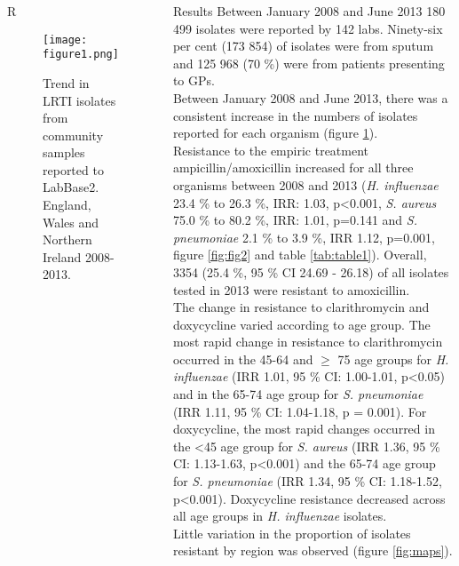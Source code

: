 \documentclass[final, 14pt]{beamer}
\begin{document}
\begin{frame}
\begin{columns}[t]
\begin{minipage}[t]{.95\textwidth}
\begin{block}{\textcolor{comp_blue}{R}}  
    \begin{figure}
   \texttt{[image: figure1.png]}
   \caption{Trend in LRTI isolates from community samples reported to LabBase2. England, Wales and Northern Ireland 2008-2013.}
   \label{fig:fig1}
   \end{figure}

\end{block}  
\end{minipage}
  
 \begin{minipage}[t]{.95\textwidth} %
  \begin{block}{Results}
   Between January 2008 and June 2013 180 499 isolates were reported by 142 labs. 
   Ninety-six per cent (173 854) of isolates were from sputum and 125 968 (70 \%) were from patients presenting to GPs. \\
   Between January 2008 and June 2013, there was a consistent increase in the numbers of isolates reported for each organism (figure \ref{fig:fig1}).\\
Resistance to the empiric treatment ampicillin/amoxicillin increased for all three organisms between 2008 and 2013 (\textit{H. influenzae} 23.4 \% to 26.3 \%, IRR: 1.03, p\textless0.001, \textit{S. aureus} 75.0 \% to 80.2 \%, IRR: 1.01, p=0.141 and \textit{S. pneumoniae} 2.1 \% to 3.9 \%, IRR 1.12, p=0.001, figure \ref{fig:fig2} and table \ref{tab:table1}).
   Overall, 3354 (25.4 \%, 95 \% CI 24.69 - 26.18) of all isolates tested in 2013 were resistant to amoxicillin. \\
   The change in resistance to clarithromycin and doxycycline varied according to age group. 
   The most rapid change in resistance to clarithromycin occurred in the 45-64 and $\ge$ 75 age groups for \textit{H. influenzae} (IRR 1.01, 95 \% CI: 1.00-1.01, p\textless0.05) and in the 65-74 age group for \textit{S. pneumoniae} (IRR 1.11, 95 \% CI: 1.04-1.18, p = 0.001). 
   For doxycycline, the most rapid changes occurred in the \textless 45 age group for \textit{S. aureus} (IRR 1.36, 95 \% CI: 1.13-1.63, p\textless0.001) and the 65-74 age group for \textit{S. pneumoniae} (IRR 1.34, 95 \% CI: 1.18-1.52, p\textless0.001). 
   Doxycycline resistance decreased across all age groups in \textit{H. influenzae} isolates.\\
   Little variation in the proportion of isolates resistant by region was observed (figure \ref{fig:maps}). 

\end{block}
\end{minipage}
\end{columns}
\end{frame}
\end{document}
